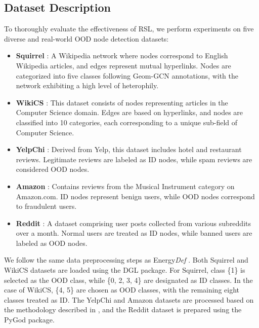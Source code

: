 \subsection{Dataset Description}\label{subsec-apdix-Dataset}

To thoroughly evaluate the effectiveness of RSL, we perform experiments on five diverse and real-world OOD node detection datasets:  
\begin{itemize}[nosep, topsep=0pt, leftmargin=*]  
    \item \textbf{Squirrel} \citep{rozemberczki2021multi}: A Wikipedia network where nodes correspond to English Wikipedia articles, and edges represent mutual hyperlinks. Nodes are categorized into five classes following Geom-GCN \citep{pei2020geom} annotations, with the network exhibiting a high level of heterophily.  
    \item \textbf{WikiCS} \citep{mernyei2020wiki}: This dataset consists of nodes representing articles in the Computer Science domain. Edges are based on hyperlinks, and nodes are classified into 10 categories, each corresponding to a unique sub-field of Computer Science.  
    \item \textbf{YelpChi} \citep{rayana2015collective}: Derived from Yelp, this dataset includes hotel and restaurant reviews. Legitimate reviews are labeled as ID nodes, while spam reviews are considered OOD nodes.  
    \item \textbf{Amazon} \citep{mcauley2013amateurs}: Contains reviews from the Musical Instrument category on Amazon.com. ID nodes represent benign users, while OOD nodes correspond to fraudulent users.  
    \item \textbf{Reddit} \citep{kumar2019predicting}: A dataset comprising user posts collected from various subreddits over a month. Normal users are treated as ID nodes, while banned users are labeled as OOD nodes.  
\end{itemize}  
 We follow the same data preprocessing steps as Energy\textit{Def} \citep{gong2024energy}. Both Squirrel and WikiCS datasets are loaded using the DGL \citep{wang2019deep} package. For Squirrel, class \{1\} is selected as the OOD class, while \{0, 2, 3, 4\} are designated as ID classes. In the case of WikiCS, \{4, 5\} are chosen as OOD classes, with the remaining eight classes treated as ID. The YelpChi and Amazon datasets are processed based on the methodology described in \citep{dou2020enhancing}, and the Reddit dataset is prepared using the PyGod \citep{liu2022bond} package.





